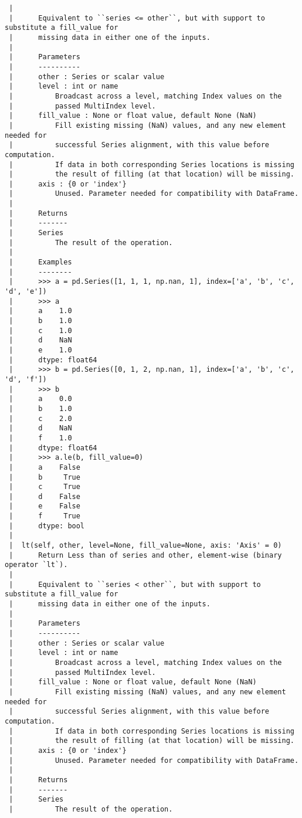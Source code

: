 \documentclass[
  letterpaper,
  DIV=11,
  numbers=noendperiod]{scrreprt}
\begin{document}
\begin{verbatim}
 |      
 |      Equivalent to ``series <= other``, but with support to substitute a fill_value for
 |      missing data in either one of the inputs.
 |      
 |      Parameters
 |      ----------
 |      other : Series or scalar value
 |      level : int or name
 |          Broadcast across a level, matching Index values on the
 |          passed MultiIndex level.
 |      fill_value : None or float value, default None (NaN)
 |          Fill existing missing (NaN) values, and any new element needed for
 |          successful Series alignment, with this value before computation.
 |          If data in both corresponding Series locations is missing
 |          the result of filling (at that location) will be missing.
 |      axis : {0 or 'index'}
 |          Unused. Parameter needed for compatibility with DataFrame.
 |      
 |      Returns
 |      -------
 |      Series
 |          The result of the operation.
 |      
 |      Examples
 |      --------
 |      >>> a = pd.Series([1, 1, 1, np.nan, 1], index=['a', 'b', 'c', 'd', 'e'])
 |      >>> a
 |      a    1.0
 |      b    1.0
 |      c    1.0
 |      d    NaN
 |      e    1.0
 |      dtype: float64
 |      >>> b = pd.Series([0, 1, 2, np.nan, 1], index=['a', 'b', 'c', 'd', 'f'])
 |      >>> b
 |      a    0.0
 |      b    1.0
 |      c    2.0
 |      d    NaN
 |      f    1.0
 |      dtype: float64
 |      >>> a.le(b, fill_value=0)
 |      a    False
 |      b     True
 |      c     True
 |      d    False
 |      e    False
 |      f     True
 |      dtype: bool
 |  
 |  lt(self, other, level=None, fill_value=None, axis: 'Axis' = 0)
 |      Return Less than of series and other, element-wise (binary operator `lt`).
 |      
 |      Equivalent to ``series < other``, but with support to substitute a fill_value for
 |      missing data in either one of the inputs.
 |      
 |      Parameters
 |      ----------
 |      other : Series or scalar value
 |      level : int or name
 |          Broadcast across a level, matching Index values on the
 |          passed MultiIndex level.
 |      fill_value : None or float value, default None (NaN)
 |          Fill existing missing (NaN) values, and any new element needed for
 |          successful Series alignment, with this value before computation.
 |          If data in both corresponding Series locations is missing
 |          the result of filling (at that location) will be missing.
 |      axis : {0 or 'index'}
 |          Unused. Parameter needed for compatibility with DataFrame.
 |      
 |      Returns
 |      -------
 |      Series
 |          The result of the operation.

\end{verbatim}
\end{document}

